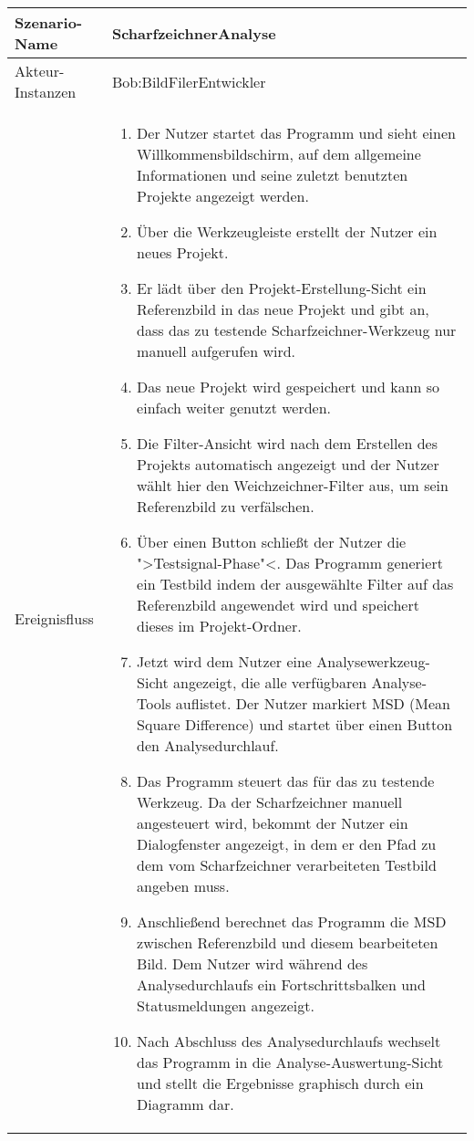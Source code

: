 \begin{tabular}{p{1.89cm}|p{13.3cm}}
\hline
Szenario-Name & ScharfzeichnerAnalyse\\
\hline
Akteur-Instanzen &Bob:BildFilerEntwickler\\ %
\hline
Ereignisfluss & 
\begin{enumerate}
\item Der Nutzer startet das Programm und sieht einen Willkommensbildschirm, auf dem allgemeine Informationen und seine zuletzt benutzten Projekte angezeigt werden.
\item Über die Werkzeugleiste erstellt der Nutzer ein neues Projekt.
\item Er lädt über den Projekt-Erstellung-Sicht ein Referenzbild in das neue Projekt und gibt an, dass das zu testende Scharfzeichner-Werkzeug nur manuell aufgerufen wird.
\item Das neue Projekt wird gespeichert und kann so einfach weiter genutzt werden.

\item Die Filter-Ansicht wird nach dem Erstellen des Projekts automatisch angezeigt und der Nutzer wählt hier den Weichzeichner-Filter aus, um sein Referenzbild zu verfälschen.
\item Über einen Button schließt der Nutzer die ">Testsignal-Phase"<. Das Programm generiert ein Testbild indem der ausgewählte Filter auf das Referenzbild angewendet wird und speichert dieses im Projekt-Ordner.
\item Jetzt wird dem Nutzer eine Analysewerkzeug-Sicht angezeigt, die alle verfügbaren Analyse-Tools auflistet. Der Nutzer markiert MSD (Mean Square Difference) und startet über einen Button den Analysedurchlauf.
\item Das Programm steuert das für das zu testende Werkzeug. Da der Scharfzeichner manuell angesteuert wird, bekommt der Nutzer ein Dialogfenster angezeigt, in dem er den Pfad zu dem vom Scharfzeichner verarbeiteten Testbild angeben muss.
\item Anschließend berechnet das Programm die MSD zwischen Referenzbild und diesem bearbeiteten Bild. Dem Nutzer wird während des Analysedurchlaufs ein Fortschrittsbalken und Statusmeldungen angezeigt.
\item Nach Abschluss des Analysedurchlaufs wechselt das Programm in die Analyse-Auswertung-Sicht und stellt die Ergebnisse graphisch durch ein Diagramm dar.
\end{enumerate}\\
\hline
\end{tabular}

